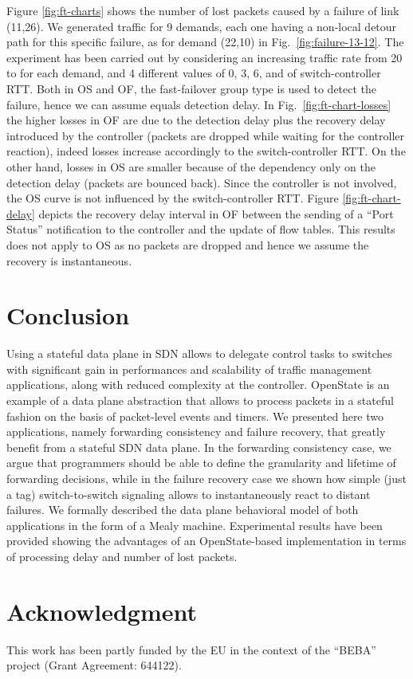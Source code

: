 \documentclass[10pt,conference]{IEEEtran}
\begin{document}
Figure \ref{fig:ft-charts} shows the number of lost packets caused by a failure of link (11,26). We generated traffic for 9 demands, each one having a non-local detour path for this specific failure, as for demand (22,10) in Fig.~\ref{fig:failure-13-12}. The experiment has been carried out by considering an increasing traffic rate from 20 to  for each demand, and 4 different values of 0, 3, 6, and  of switch-controller RTT. Both in OS and OF, the fast-failover group type is used to detect the failure, hence we can assume equals detection delay. In Fig.~\ref{fig:ft-chart-losses} the higher losses in OF are due to the detection delay plus the recovery delay introduced by the controller (packets are dropped while waiting for the controller reaction), indeed losses increase accordingly to the switch-controller RTT. On the other hand, losses in OS are smaller because of the dependency only on the detection delay (packets are bounced back). Since the controller is not involved, the OS curve is not influenced by the switch-controller RTT. Figure \ref{fig:ft-chart-delay} depicts the recovery delay interval in OF between the sending of a ``Port Status'' notification to the controller and the update of flow tables. This results does not apply to OS as no packets are dropped and hence we assume the recovery is instantaneous.

\section{Conclusion}
\label{sec:conclusion}

Using a stateful data plane in SDN allows to delegate control tasks to switches with significant gain in performances and scalability of traffic management applications, along with reduced complexity at the controller. OpenState is an example of a data plane abstraction that allows to process packets in a stateful fashion on the basis of packet-level events and timers. We presented here two applications, namely forwarding consistency and failure recovery, that greatly benefit from a stateful SDN data plane. In the forwarding consistency case, we argue that programmers should be able to define the granularity and lifetime of forwarding decisions, while in the failure recovery case we shown how simple (just a tag) switch-to-switch signaling allows to instantaneously react to distant failures. We formally described the data plane behavioral model of both applications in the form of a Mealy machine. Experimental results have been provided showing the advantages of an OpenState-based implementation in terms of processing delay and number of lost packets.

\section*{Acknowledgment}
This work has been partly funded by the EU in the context of the ``BEBA'' project \cite{beba} (Grant Agreement: 644122).



\end{document}
